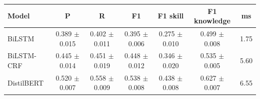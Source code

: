 \begin{tabular}{l ccc cc c}
\hline
Model & P & R & F1 & F1 skill & F1 knowledge & ms \\
\hline
BiLSTM & 0.389 $\pm$ 0.015 & 0.402 $\pm$ 0.011 & 0.395 $\pm$ 0.006 & 0.275 $\pm$ 0.010 & 0.499 $\pm$ 0.008 & 1.75 \\
BiLSTM-CRF & 0.445 $\pm$ 0.014 & 0.451 $\pm$ 0.019 & 0.448 $\pm$ 0.012 & 0.346 $\pm$ 0.020 & 0.535 $\pm$ 0.005 & 5.60 \\
DistilBERT & 0.520 $\pm$ 0.007 & 0.558 $\pm$ 0.009 & 0.538 $\pm$ 0.008 & 0.438 $\pm$ 0.008 & 0.627 $\pm$ 0.007 & 6.55 \\
\hline
\end{tabular}
